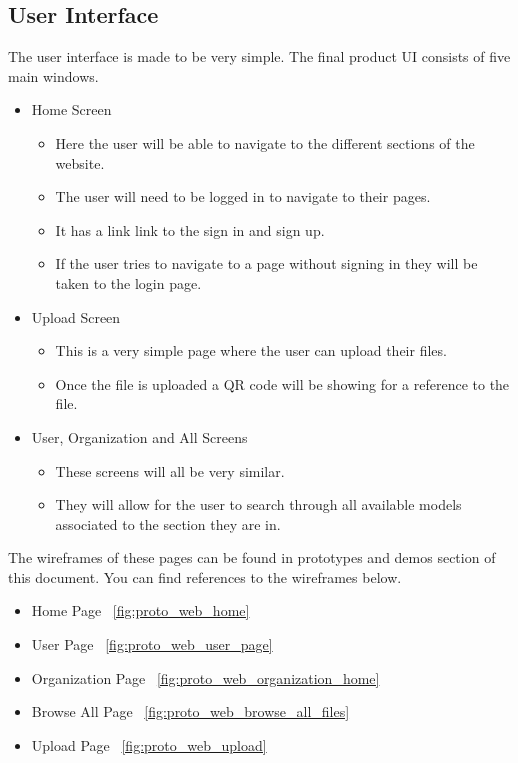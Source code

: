 \subsection{User Interface}
The user interface is made to be very simple. The final product
UI consists of five main windows. 
\begin{itemize}
    \item Home Screen
    \begin{itemize}
        \item Here the user will be able to navigate to the different sections of the website.
        \item The user will need to be logged in to navigate to their pages.
        \item It has a link link to the sign in and sign up.
        \item If the user tries to navigate to a page without signing in
        they will be taken to the login page.
    \end{itemize}

    \item Upload Screen
    \begin{itemize}
        \item This is a very simple page where the user can upload their files.
        \item Once the file is uploaded a QR code will be showing for a reference to the file.
    \end{itemize}

    \item User, Organization and All Screens
    \begin{itemize}
        \item These screens will all be very similar.
        \item They will allow for the user to search through all
        available models associated to the section they are in.
    \end{itemize}
\end{itemize}

The wireframes of these pages can be found in prototypes and demos section of this document.
You can find references to the wireframes below.
\begin{itemize}
    \item Home Page ~\ref{fig:proto_web_home}
    \item User Page ~\ref{fig:proto_web_user_page}
    \item Organization Page ~\ref{fig:proto_web_organization_home}
    \item Browse All Page ~\ref{fig:proto_web_browse_all_files}
    \item Upload Page ~\ref{fig:proto_web_upload}
\end{itemize}

